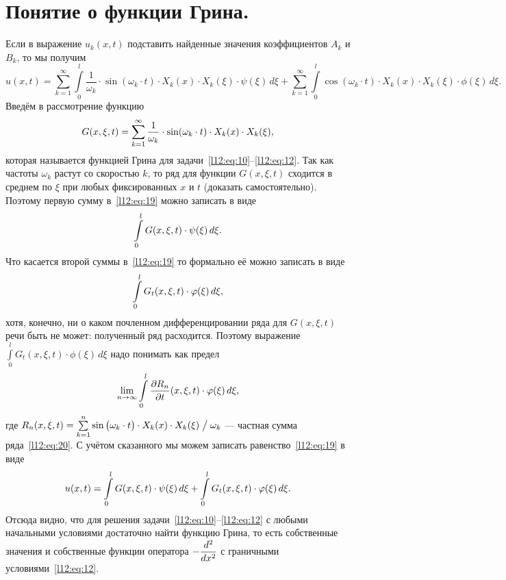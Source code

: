 \section{Понятие о функции Грина.}
\label{lecture11section3}
Если в выражение $u_k(x,t)$ подставить найденные значения коэффициентов $A_k$ и  $B_k$, то мы получим
\begin{equation}
	\label{l12:eq:19}
	u(x,t)=\sum\limits_{k=1}^{\infty}\int\limits_0^l\frac{1}{\omega_k}\cdot\sin(\omega_k\cdot t)\cdot X_k(x)\cdot X_k(\xi)\cdot\psi(\xi)\,d\xi+ \sum\limits_{k=1}^{\infty}\int\limits_0^l\cos(\omega_k\cdot t)\cdot X_k(x)\cdot X_k(\xi)\cdot\phi(\xi)\,d\xi.
\end{equation}
Введём в рассмотрение функцию
\begin{equation}
	\label{l12:eq:20}
	\hfill G(x,\xi,t)=\sum\limits_{k=1}^{\infty}\frac{1}{\omega_k}\cdot\sin(\omega_k\cdot t)\cdot X_k(x)\cdot X_k(\xi),\hfill
\end{equation}
которая называется функцией Грина для задачи~\eqref{l12:eq:10}--\eqref{l12:eq:12}. Так как частоты $\omega_k$ растут со скоростью $k$, то ряд для функции $G(x,\xi,t)$ сходится в среднем по $\xi$ при любых фиксированных $x$ и $t$ (доказать самостоятельно). Поэтому первую сумму в~\eqref{l12:eq:19} можно записать в виде 
\begin{equation*}
	\hfill\int\limits_0^l G(x,\xi,t)\cdot\psi(\xi)\,d\xi.\hfill
\end{equation*}
Что касается второй суммы в~\eqref{l12:eq:19} то формально её можно записать в виде 
\begin{equation*}
	\hfill\int\limits_0^l G_t(x,\xi,t)\cdot\phi(\xi)\,d\xi,\hfill
\end{equation*}
хотя, конечно, ни о каком почленном дифференцировании ряда для $G(x,\xi,t)$ речи быть не может: полученный ряд расходится. Поэтому выражение $\int\limits_0^l G_t(x,\xi,t)\cdot\phi(\xi)\,d\xi$ надо понимать как предел 
\begin{equation*}
	\hfill\lim\limits_{n\to\infty}\int\limits_0^l\pder{R_n}{t}(x,\xi,t)\cdot\phi(\xi)\,d\xi,\hfill
\end{equation*}
где $R_n(x,\xi,t)=\sum\limits_{k=1}^n\sin\big(\omega_k\cdot t\big)\cdot X_k(x)\cdot X_k(\xi)\bigm/\omega_k$ --- частная сумма ряда~\eqref{l12:eq:20}. С учётом сказанного мы можем записать равенство~\eqref{l12:eq:19} в виде
\begin{equation}
	\label{l12:eq:21}
	\hfill u(x,t)=\int\limits_0^l G(x,\xi,t)\cdot\psi(\xi)\,d\xi+\int\limits_0^l G_t(x,\xi,t)\cdot\phi(\xi)\,d\xi.\hfill
\end{equation}
Отсюда видно, что для решения задачи~\eqref{l12:eq:10}--\eqref{l12:eq:12} с любыми начальными условиями достаточно найти функцию Грина, то есть собственные значения и собственные функции оператора $-\displaystyle\frac{d^2}{dx^2}$ с граничными условиями~\eqref{l12:eq:12}.

